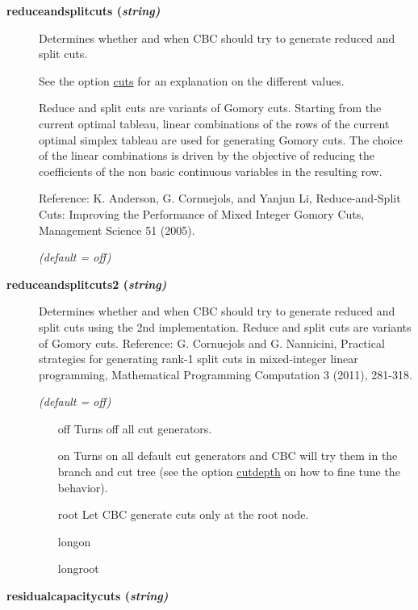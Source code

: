 \begin{description}
\item[\label{reduceandsplitcuts}\hypertarget{reduceandsplitcuts}
{\textbf{reduceandsplitcuts (\slshape{string})}}]\hspace{1.0in}

Determines whether and when CBC should try to generate reduced and split cuts.

See the option \hyperlink{cuts}{cuts} for an explanation on the different values.

Reduce and split cuts are variants of Gomory cuts.
Starting from the current optimal tableau, linear combinations of the rows of the current optimal simplex tableau are used for generating Gomory cuts.
The choice of the linear combinations is driven by the objective of reducing the coefficients of the non basic continuous variables in the resulting row.

Reference: K. Anderson, G. Cornuejols, and Yanjun Li, Reduce-and-Split Cuts: Improving the Performance of Mixed Integer Gomory Cuts, Management Science 51 (2005).

\textsl{(default = off)}

\item[\label{reduceandsplitcuts2}\hypertarget{reduceandsplitcuts2}
{\textbf{reduceandsplitcuts2 (\slshape{string})}}]\hspace{1.0in}

Determines whether and when CBC should try to generate reduced and split cuts using the 2nd implementation.
Reduce and split cuts are variants of Gomory cuts.
Reference:
G. Cornuejols and G. Nannicini, Practical strategies for generating rank-1 split cuts in mixed-integer linear programming, Mathematical Programming Computation 3 (2011), 281-318.

\textsl{(default = off)}
\begin{itemize}
\item[off] 
Turns off all cut generators.
\item[on] 
Turns on all default cut generators and CBC will try them in the branch and cut tree (see the option \hyperlink{cutdepth}{cutdepth} on how to fine tune the behavior).
\item[root] 
Let CBC generate cuts only at the root node.
\item[longon]
\item[longroot]
\end{itemize}

\item[\label{residualcapacitycuts}\hypertarget{residualcapacitycuts}
{\textbf{residualcapacitycuts (\slshape{string})}}]\hspace{1.0in}


\end{description}
